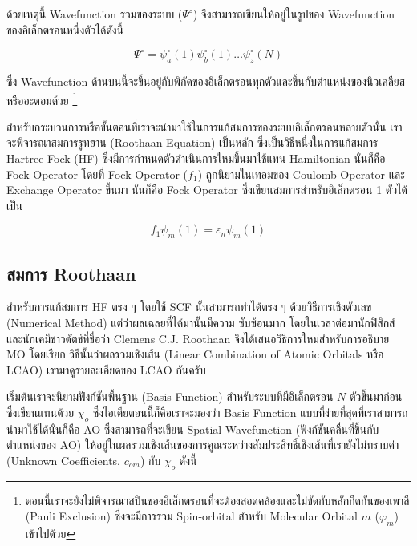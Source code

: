ด้วยเหตุนี้ Wavefunction รวมของระบบ ($\Psi^{\circ}$) จึงสามารถเขียนให้อยู่ในรูปของ Wavefunction ของอิเล็กตรอนหนึ่งตัวได้ดังนี้

\begin{equation}
    \Psi^{\circ} = \psi^{\circ}_{a}(1) \psi^{\circ}_{b}(1) \dots \psi^{\circ}_{z}(N)
\end{equation}

\noindent ซึ่ง Wavefunction ด้านบนนี้จะขึ้นอยู่กับพิกัดของอิเล็กตรอนทุกตัวและขึ้นกับตำแหน่งของนิวเคลียสหรืออะตอมด้วย%
\footnote{ตอนนี้เราจะยังไม่พิจารณาสปินของอิเล็กตรอนที่จะต้องสอดคล้องและไม่ขัดกับหลักกีดกันของเพาลี (Pauli Exclusion)
ซึ่งจะมีการรวม Spin-orbital สำหรับ Molecular Orbital $m$ ($\varphi_{m}$) เข้าไปด้วย}

สำหรับกระบวนการหรือขั้นตอนที่เราจะนำมาใช้ในการแก้สมการของระบบอิเล็กตรอนหลายตัวนั้น เราจะพิจารณาสมการรูทฮาน (Roothaan Equation) 
เป็นหลัก ซึ่งเป็นวิธีหนึ่งในการแก้สมการ Hartree-Fock (HF) ซึ่งมีการกำหนดตัวดำเนินการใหม่ขึ้นมาใช้แทน Hamiltonian นั่นก็คือ Fock Operator 
โดยที่ Fock Operator ($f_{1}$) ถูกนิยามในเทอมของ Coulomb Operator และ Exchange Operator ขึ้นมา นั่นก็คือ Fock Operator 
ซึ่งเขียนสมการสำหรับอิเล็กตรอน 1 ตัวได้เป็น

\begin{equation}\label{eq:fock}
    f_{1} \psi_{m}(1) = \varepsilon_{n} \psi_{m}(1)
\end{equation}

\subsection{สมการ Roothaan}
\label{ssec:roothaan}

สำหรับการแก้สมการ HF ตรง ๆ โดยใช้ SCF นั้นสามารถทำได้ตรง ๆ ด้วยวิธีการเชิงตัวเลข (Numerical Method) แต่ว่าผลเฉลยที่ได้มานั้นมีความ%
ซับซ้อนมาก โดยในเวลาต่อมานักฟิสิกส์และนักเคมีชาวดัตช์ที่ชื่อว่า Clemens C.J. Roothaan จึงได้เสนอวิธีการใหม่สำหรับการอธิบาย MO โดยเรียก%
วิธีนั้นว่าผลรวมเชิงเส้น (Linear Combination of Atomic Orbitals หรือ LCAO)\autocite{atkins2010} เรามาดูรายละเอียดของ LCAO 
กันครับ 

เริ่มต้นเราจะนิยามฟังก์ชันพื้นฐาน (Basis Function) สำหรับระบบที่มีอิเล็กตรอน $N$ ตัวขึ้นมาก่อน ซึ่งเขียนแทนด้วย $\chi_{o}$
ซึ่งไอเดียตอนนี้ก็คือเราจะมองว่า Basis Function แบบที่ง่ายที่สุดที่เราสามารถนำมาใช้ได้นั่นก็คือ AO ซึ่งสามารถที่จะเขียน Spatial Wavefunction 
(ฟังก์ชันคลื่นที่ขึ้นกับตำแหน่งของ AO) ให้อยู่ในผลรวมเชิงเส้นของการคูณระหว่างสัมประสิทธิ์เชิงเส้นที่เรายังไม่ทราบค่า (Unknown Coefficients, 
$c_{om}$) กับ $\chi_{o}$ ดังนี้

